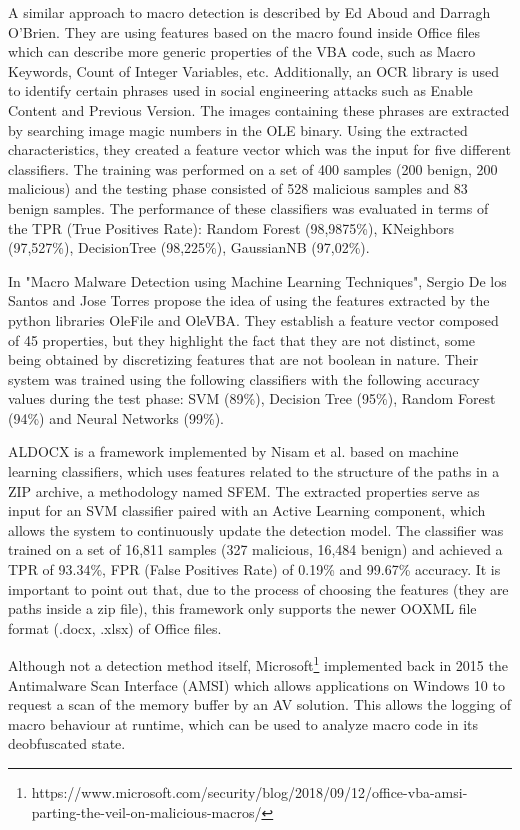 A similar approach to macro detection is described by Ed Aboud and Darragh O'Brien\cite{AboudO18}. They are using features based on the macro found inside Office files which can describe more generic properties of the VBA code, such as Macro Keywords, Count of Integer Variables, etc. Additionally, an OCR library is used to identify certain phrases used in social engineering attacks such as Enable Content and Previous Version. The images containing these phrases are extracted by searching image magic numbers in the OLE binary. Using the extracted characteristics, they created a feature vector which was the input for five different classifiers. The training was performed on a set of 400 samples (200 benign, 200 malicious) and the testing phase consisted of 528 malicious samples and 83 benign samples. The performance of these classifiers was evaluated in terms of the TPR (True Positives Rate): Random Forest (98,9875\%), KNeighbors (97,527\%), DecisionTree (98,225\%), GaussianNB (97,02\%).
\par
In "Macro Malware Detection using Machine Learning Techniques"\cite{SantosT17}, Sergio De los Santos and Jose Torres propose the idea of using the features extracted by the python libraries OleFile and OleVBA. They establish a feature vector composed of 45 properties, but they highlight the fact that they are not distinct, some being obtained by discretizing features that are not boolean in nature. Their system was trained  using the following classifiers with the following accuracy values during the test phase: SVM (89\%),  Decision Tree (95\%), Random Forest (94\%) and Neural Networks (99\%). 
\par
ALDOCX is a framework implemented by Nisam et al.\cite{NissimCE17} based on machine learning classifiers, which uses features related to the structure of the paths in a ZIP archive, a methodology named SFEM. The extracted properties serve as input for an SVM classifier paired with an Active Learning component, which allows the system to continuously update the detection model. The classifier was trained on a set of 16,811 samples (327 malicious, 16,484 benign) and achieved a TPR of 93.34\%, FPR (False Positives Rate) of 0.19\% and 99.67\% accuracy. It is important to point out that, due to the process of choosing the features (they are paths inside a zip file), this framework only supports the newer OOXML file format (.docx, .xlsx) of Office files.
\par
Although not a detection method itself, Microsoft\footnote{https://www.microsoft.com/security/blog/2018/09/12/office-vba-amsi-parting-the-veil-on-malicious-macros/} implemented back in 2015 the Antimalware Scan Interface (AMSI) which allows applications on Windows 10 to request a scan of the memory buffer by an AV solution. This allows the logging of macro behaviour at runtime, which can be used to analyze macro code in its deobfuscated state.
